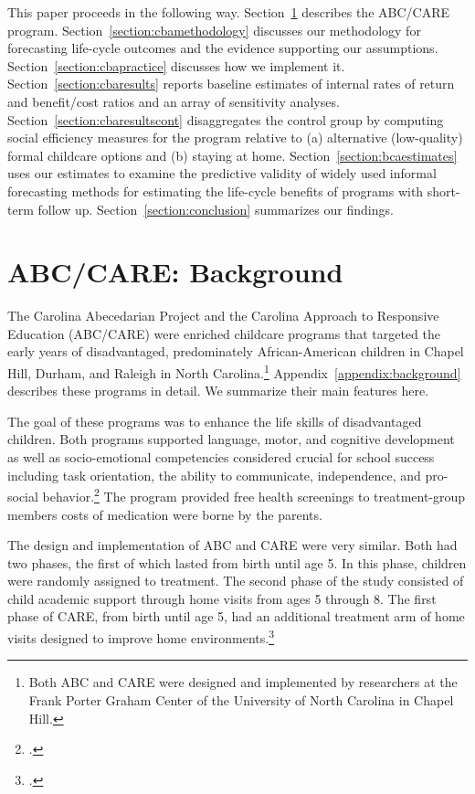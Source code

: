 This paper proceeds in the following way. Section~\ref{section:background} describes the ABC/CARE program. Section~\ref{section:cbamethodology} discusses our methodology for forecasting life-cycle outcomes and the evidence supporting our assumptions. Section~\ref{section:cbapractice} discusses how we implement it. Section~\ref{section:cbaresults} reports baseline estimates of internal rates of return and benefit/cost ratios and an array of sensitivity analyses. Section~\ref{section:cbaresultscont} disaggregates the control group by computing social efficiency measures for the program relative to (a) alternative (low-quality) formal childcare options and (b) staying at home. Section~\ref{section:bcaestimates} uses our estimates to examine the predictive validity of widely used informal forecasting methods for estimating the life-cycle benefits of programs with short-term follow up. Section~\ref{section:conclusion} summarizes our findings.

\section{ABC/CARE: Background} \label{section:background}

The Carolina Abecedarian Project and the Carolina Approach to Responsive Education (ABC/CARE) were enriched childcare programs that targeted the early years of disadvantaged, predominately African-American children in Chapel Hill, Durham, and Raleigh in North Carolina.\footnote{Both ABC and CARE were designed and implemented by researchers at the Frank Porter Graham Center of the University of North Carolina in Chapel Hill.} Appendix~\ref{appendix:background} describes these programs in detail. We summarize their main features here.

The goal of these programs was to enhance the life skills of disadvantaged children. Both programs supported language, motor, and cognitive development as well as socio-emotional competencies considered crucial for school success including task orientation, the ability to communicate, independence, and pro-social behavior.\footnote{\citet{Sparling_1974_Synth_Edu_Infant_SPEECH, Ramey_Collier_etal_1976_CarolinaAbecedarianProject, Ramey_etal_1985_Project-CARE_TiECSE, Wasik_Ramey_etal_1990_CD, Ramey-etal_2012-ABC}.} The program provided free health screenings to treatment-group members costs of medication were borne by the parents.

The design and implementation of ABC and CARE were very similar. Both had two phases, the first of which lasted from birth until age 5. In this phase, children were randomly assigned to treatment. The second phase of the study consisted of child academic support through home visits from ages 5 through 8. The first phase of CARE, from birth until age 5, had an additional treatment arm of home visits designed to improve home environments.\footnote{\citet{Wasik_Ramey_etal_1990_CD}.}

